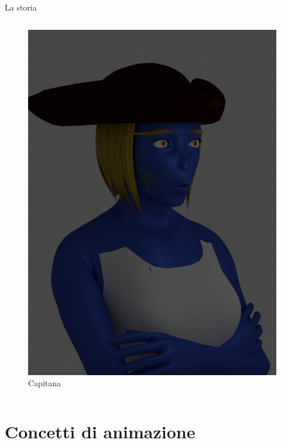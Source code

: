 \documentclass[10pt]{beamer}
\begin{document}
\begin{frame}[fragile]{La storia}
\begin{columns}[T,onlytextwidth]
      \begin{figure}
          \centering
          \includegraphics[width=\textwidth]{figures/Capitana.png}
          \caption{Capitana}
      \end{figure}
  \end{columns}
\end{frame}

\section{Concetti di animazione}
\end{document}
